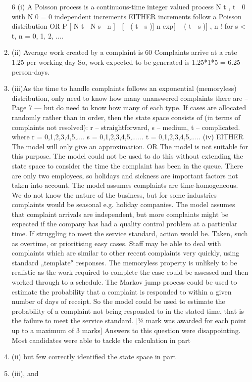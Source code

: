 \documentclass[a4paper,12pt]{article}
\begin{document}
\begin{enumerate}
6
(i) A Poisson process is a continuous-time integer valued process
N t , t  0 with
N 0 = 0
independent increments
EITHER
increments follow a Poisson distribution
OR
P [ N t  N s  n ] 
[  ( t  s )] n exp[  ( t  s )]
,
n !
for s < t, n = 0, 1, 2, ....
\item (ii) Average work created by a complaint is
60%
Complaints arrive at a rate 1.25 per working day
So, work expected to be generated is 1.25*1*5 = 6.25 person-days.
\item (iii)As the time to handle complaints follows an exponential (memoryless)
distribution, only need to know how many unanswered complaints there are –
Page 7  — %
but do need to know how many of each type. If cases are allocated randomly
rather than in order, then the state space consists of (in terms of complaints not
resolved):
r – straightforward,
s – medium,
t – complicated.
where r = 0,1,2,3,4,5,....
s = 0,1,2,3,4,5,......
t = 0,1,2,3,4,5,.....
(iv)
EITHER The model will only give an approximation.
OR The model is not suitable for this purpose.
The model could not be used to do this without extending the state space to
consider the time the complaint has been in the queue. There are only two
employees, so holidays and sickness are important factors not taken into
account.
The model assumes complaints are time-homogeneous. We do not know the
nature of the business, but for some industries complaints would be seasonal
e.g. holiday companies.
The model assumes that complaint arrivals are independent, but more
complaints might be expected if the company has had a quality control
problem at a particular time. If struggling to meet the service standard, action
would be. Taken, such as overtime, or prioritising easy cases. Staff may be
able to deal with complaints which are similar to other recent complaints very
quickly, using standard „template‟ responses.
The memoryless property is unlikely to be realistic as the work required to
complete the case could be assessed and then worked through to a schedule.
The Markov jump process could be used to estimate the probability that a
complaint is responded to within a given number of days of receipt.
So the model could be used to estimate the probability of a complaint not
being responded to in the stated time, that is the failure to meet the service
standard.
[1⁄2 mark was awarded for each point up to a maximum of 3 marks]
Answers to this question were disappointing. Most candidates were able to tackle the
calculation in part \item (ii) but few correctly identified the state space in part \item (iii), and

\end{enumerate}
\end{document}
